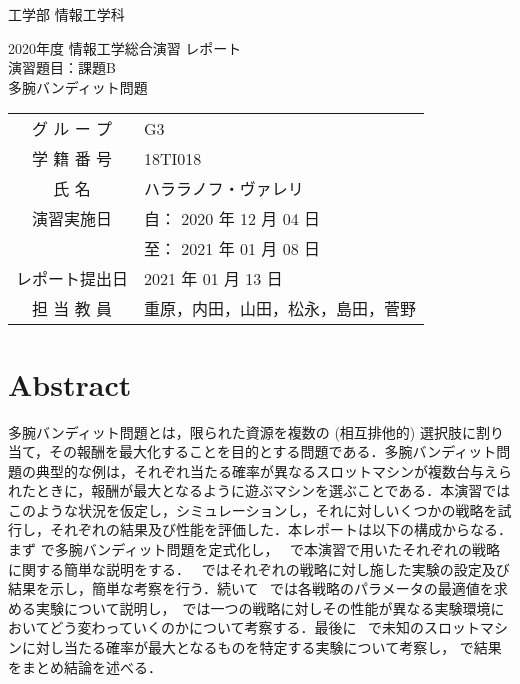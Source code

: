 \documentclass{jsarticle}
\begin{document}
\begin{titlepage}
	\begin{flushleft}
	{\Large 工学部 情報工学科}
	\end{flushleft}
	\vspace{100pt}
	\begin{center}
		{\huge 2020年度 情報工学総合演習 レポート}\\
		\vspace{40pt}
		{\huge 演習題目：課題B}\\ \vspace{10pt}
		{\huge 多腕バンディット問題}\\
		\vspace{100pt}
		\begin{table}[hp]
			\centering \LARGE
			\begin{tabular}{cl}
				グ ル ー プ    & G3 \\
				学 籍 番 号    & 18TI018 \\
				氏 名          & ハララノフ・ヴァレリ \\
				演習実施日     & 自： 2020 年 12 月 04 日\\
				               & 至： 2021 年 01 月 08 日 \\
				レポート提出日 & 2021 年 01 月 13 日 \\
				担 当 教 員 & 重原，内田，山田，松永，島田，菅野 \\
			\end{tabular}
		\end{table}
		\vfill
	\end{center}
\end{titlepage}
\newpage

\section*{Abstract}

多腕バンディット問題とは，限られた資源を複数の (相互排他的) 選択肢に割り当て，その報酬を最大化することを目的とする問題である．多腕バンディット問題の典型的な例は，それぞれ当たる確率が異なるスロットマシンが複数台与えられたときに，報酬が最大となるように遊ぶマシンを選ぶことである．本演習ではこのような状況を仮定し，シミュレーションし，それに対しいくつかの戦略を試行し，それぞれの結果及び性能を評価した．本レポートは以下の構成からなる．まず  で多腕バンディット問題を定式化し， ~で本演習で用いたそれぞれの戦略に関する簡単な説明をする． ~ではそれぞれの戦略に対し施した実験の設定及び結果を示し，簡単な考察を行う．続いて ~では各戦略のパラメータの最適値を求める実験について説明し，~では一つの戦略に対しその性能が異なる実験環境においてどう変わっていくのかについて考察する．最後に ~で未知のスロットマシンに対し当たる確率が最大となるものを特定する実験について考察し， で結果をまとめ結論を述べる．
\end{document}
